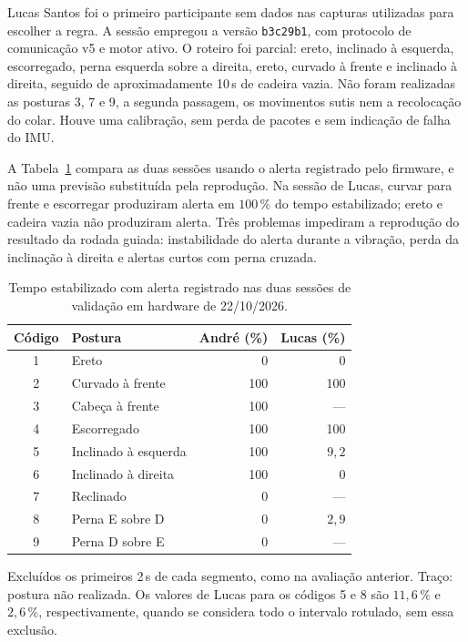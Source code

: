 Lucas Santos foi o primeiro participante sem dados nas capturas utilizadas
para escolher a regra. A sessão empregou a versão \texttt{b3c29b1}, com
protocolo de comunicação v5 e motor ativo. O roteiro foi parcial: ereto,
inclinado à esquerda, escorregado, perna esquerda sobre a direita, ereto,
curvado à frente e inclinado à direita, seguido de aproximadamente 10\,s
de cadeira vazia. Não foram realizadas as posturas 3, 7 e 9, a segunda
passagem, os movimentos sutis nem a recolocação do colar. Houve uma calibração,
sem perda de pacotes e sem indicação de falha do IMU.

A Tabela~\ref{tab:res-validacao} compara as duas sessões usando o alerta
registrado pelo firmware, e não uma previsão substituída pela reprodução.
Na sessão de Lucas, curvar para frente e escorregar produziram alerta em
$100\,\%$ do tempo estabilizado; ereto e cadeira vazia não produziram
alerta. Três problemas impediram a reprodução do resultado da rodada guiada:
instabilidade do alerta durante a vibração, perda da inclinação à direita
e alertas curtos com perna cruzada.

\begin{table}[H]
  \centering
  \caption{Tempo estabilizado com alerta registrado nas duas sessões de
  validação em hardware de 22/10/2026.}
  \label{tab:res-validacao}
  \begin{singlespace}
  \begin{tabularx}{\linewidth}{cXrr}
    \toprule
    Código & Postura & André (\%) & Lucas (\%) \\
    \midrule
    1 & Ereto                & 0 & 0 \\
    2 & Curvado à frente     & 100 & 100 \\
    3 & Cabeça à frente      & 100 & --- \\
    4 & Escorregado          & 100 & 100 \\
    5 & Inclinado à esquerda & 100 & $9{,}2$ \\
    6 & Inclinado à direita  & 100 & 0 \\
    7 & Reclinado            & 0 & --- \\
    8 & Perna E sobre D      & 0 & $2{,}9$ \\
    9 & Perna D sobre E      & 0 & --- \\
    \bottomrule
  \end{tabularx}
  \end{singlespace}
  \par\smallskip
  {\footnotesize Excluídos os primeiros 2\,s de cada segmento, como na
  avaliação anterior. Traço: postura não realizada. Os valores de Lucas
  para os códigos 5 e 8 são $11{,}6\,\%$ e $2{,}6\,\%$, respectivamente,
  quando se considera todo o intervalo rotulado, sem essa exclusão.}
\end{table}

